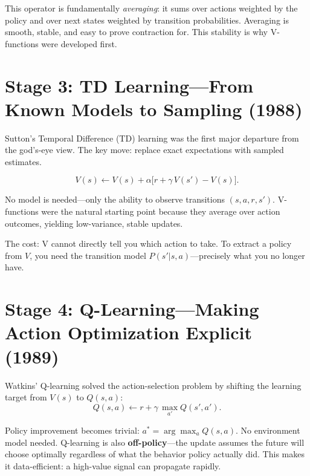 This operator is fundamentally \emph{averaging}: it sums over actions weighted by the policy and over next states weighted by transition probabilities.
Averaging is smooth, stable, and easy to prove contraction for.
This stability is why V-functions were developed first.

\section{Stage 3: TD Learning---From Known Models to Sampling (1988)}
\label{sec:stage3-td}

Sutton's Temporal Difference (TD) learning was the first major departure from the god's-eye view.
The key move: replace exact expectations with sampled estimates.

\begin{equation}
V(s) \leftarrow V(s) + \alpha\bigl[r + \gamma\, V(s') - V(s)\bigr].
\end{equation}

No model is needed---only the ability to observe transitions $(s, a, r, s')$.
V-functions were the natural starting point because they average over action outcomes, yielding low-variance, stable updates.

The cost: V cannot directly tell you which action to take.
To extract a policy from $V$, you need the transition model $P(s'|s,a)$---precisely what you no longer have.

\section{Stage 4: Q-Learning---Making Action Optimization Explicit (1989)}
\label{sec:stage4-q}

Watkins' Q-learning solved the action-selection problem by shifting the learning target from $V(s)$ to $Q(s,a)$:
\begin{equation}
Q(s,a) \leftarrow r + \gamma\,\max_{a'} Q(s',a').
\end{equation}

Policy improvement becomes trivial: $a^{\ast} = \arg\max_a Q(s,a)$.
No environment model needed.
Q-learning is also \textbf{off-policy}---the update assumes the future will choose optimally regardless of what the behavior policy actually did.
This makes it data-efficient: a high-value signal can propagate rapidly.

